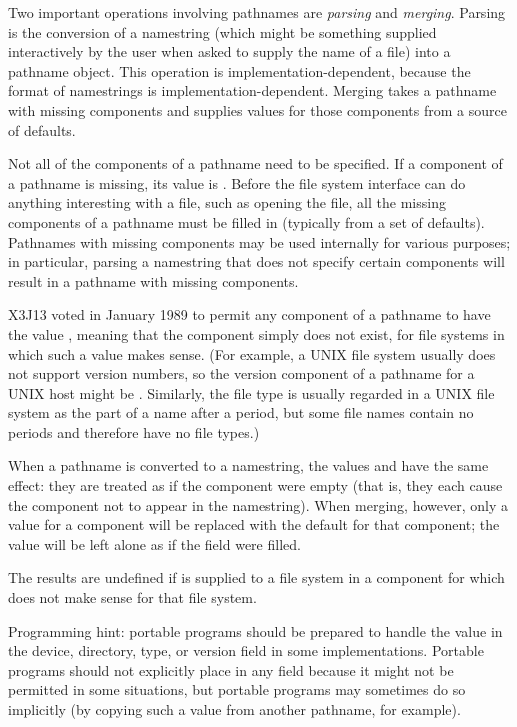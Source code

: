 Two important operations involving pathnames are \emph{parsing} and
\emph{merging}.  Parsing is the conversion of a namestring (which might be
something supplied interactively by the user when asked to supply the
name of a file) into a pathname object.  This operation is
implementation-dependent, because the format of namestrings
is implementation-dependent.
Merging takes a pathname with missing components
and supplies values for those components from a source of defaults.

Not all of the components of a pathname need to be specified.  If a
component of a pathname is missing, its value is {\nil}.  Before the file
system interface can do anything interesting with a file, such as opening the
file, all the missing components of a pathname must be filled in
(typically from a set of defaults).  Pathnames with missing components
may be used internally for various purposes;
in particular, parsing a namestring
that does not specify certain components will result in a pathname with
missing components.

\begin{newer}
X3J13 voted in January 1989 
to permit any component of a pathname to have the value ,
meaning that the component simply does not exist,
for file systems in which such a value makes sense.
(For example, a UNIX file system usually does not support version numbers,
so the version component of a pathname for a UNIX host might be
.  Similarly,
the file type is usually regarded in a UNIX file system as the part
of a name after a period, but some file names contain no periods and therefore have
no file types.)

  When a pathname is converted to a namestring, the values  and 
  have the same effect: they
  are treated as if the component were empty (that is, they each cause the
  component not to appear in the namestring).
  When merging, however, only a  value for a component will be
  replaced with the default for that component; the value 
  will be left alone as if the field were filled.

  The results are undefined if  is supplied
  to a file system in a component for which
   does not make sense for that file system.

  Programming hint:
  portable programs should be prepared to handle the value  in the device,
  directory, type, or version field in some implementations.
  Portable programs should not explicitly place  in any
  field because it might not be permitted in some situations,
  but portable programs may sometimes do so implicitly (by copying
  such a value from another pathname, for example).
\end{newer}

